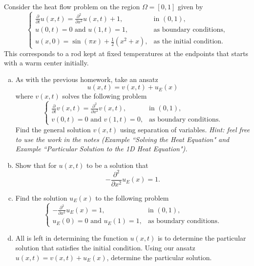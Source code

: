 \documentclass[12pt]{article} %
\begin{document}
\begin{problem}
Consider the heat flow problem on the region $\Omega=[0,1]$ given by
\[
\begin{cases}
\frac{\partial}{\partial t} u(x,t) = \frac{\partial^2}{\partial x^2} u(x,t) + 1, & \textrm{in $(0,1)$},\\
u(0,t)=0 \textrm{~and~} u(1,t)=1, & \text{as boundary conditions},\\
u(x,0) = \sin\left(\pi x\right) + \frac{1}{2}(x^2+x), & \textrm{as the initial condition}.
\end{cases}
\]
This corresponds to a rod kept at fixed temperatures at the endpoints that starts with a warm center initially.
\begin{enumerate}[(a)]
    \item As with the previous homework, take an ansatz
    \[
    u(x,t) = v(x,t) + u_E(x)
    \]
    where $v(x,t)$ solves the following problem
    \[
\begin{cases}
\frac{\partial}{\partial t} v(x,t) = \frac{\partial^2}{\partial x^2} v(x,t), & \textrm{in $(0,1)$},\\
v(0,t)=0 \textrm{~and~} v(1,t)=0, & \text{as boundary conditions}.
\end{cases}
    \]
    Find the general solution $v(x,t)$ using separation of variables. \emph{Hint: feel free to use the work in the notes (Example ``Solving the Heat Equation" and Example ``Particular Solution to the 1D Heat Equation").}

    \item Show that for $u(x,t)$ to be a solution that
    \[
    -\frac{\partial^2}{\partial x^2} u_E(x) = 1.
    \]

    \item Find the solution $u_E(x)$ to the following problem
    \[
    \begin{cases}
    -\frac{\partial^2}{\partial x^2} u_E(x) = 1, & \textrm{in $(0,1)$},\\
    u_E(0)=0 \textrm{~and~} u_E(1)=1, & \text{as boundary conditions}.
    \end{cases}
    \]
    
    \item All is left in determining the function $u(x,t)$ is to determine the particular solution that satisfies the initial condition. Using our ansatz $u(x,t)=v(x,t)+u_E(x)$, determine the particular solution.
\end{enumerate}
\end{problem}
\end{document}
